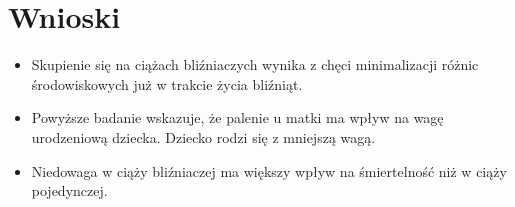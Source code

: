 \documentclass{classrep}
\begin{document}
\section{Wnioski}

    \begin{itemize}
        \item Skupienie się na ciążach bliźniaczych wynika z chęci minimalizacji różnic środowiskowych już w trakcie życia bliźniąt.
        \item Powyższe badanie wskazuje, że palenie u matki ma wpływ na wagę urodzeniową dziecka. Dziecko rodzi się z mniejszą wagą.
        \item Niedowaga w ciąży bliźniaczej ma większy wpływ na śmiertelność niż w ciąży pojedynczej.
    \end{itemize}
\end{document}
